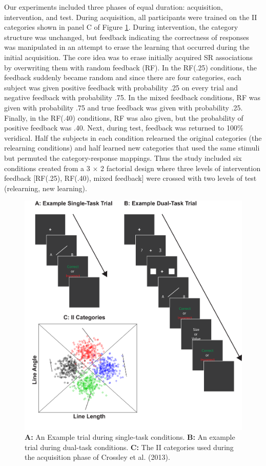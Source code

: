 \documentclass[man,apacite,draftfirst]{apa6} \usepackage{amsmath}
\begin{document}
Our experiments included three phases of equal duration: acquisition,
intervention, and test. During acquisition, all participants were trained on the
II categories shown in panel C of Figure \ref{fig:test_cats}. During
intervention, the category structure was unchanged, but feedback indicating the
correctness of responses was manipulated in an attempt to erase the learning
that occurred during the initial acquisition. The core idea was to erase
initially acquired SR associations by overwriting them with random feedback
(RF). In the RF(.25) conditions, the feedback suddenly became random and since
there are four categories, each subject was given positive feedback with
probability .25 on every trial and negative feedback with probability .75. In
the mixed feedback conditions, RF was given with probability .75 and true
feedback was given with probability .25. Finally, in the RF(.40) conditions, RF
was also given, but the probability of positive feedback was .40. Next, during
test, feedback was returned to 100\% veridical. Half the subjects in each
condition relearned the original categories (the relearning conditions) and half
learned new categories that used the same stimuli but permuted the
category-response mappings. Thus the study included six conditions created from
a 3 $\times$ 2 factorial design where three levels of intervention feedback
[RF(.25), RF(.40), mixed feedback] were crossed with two levels of test
(relearning, new learning).

\begin{figure}[t]
\centering \includegraphics[width=1.0\textwidth]{../figures/fig_trials.pdf}
  \caption{ \textbf{A:} An Example trial during single-task conditions.
\textbf{B:} An example trial during dual-task conditions. \textbf{C:} The II
categories used during the acquisition phase of Crossley et al. (2013). }
  \label{fig:test_cats}
\end{figure}
\end{document}
